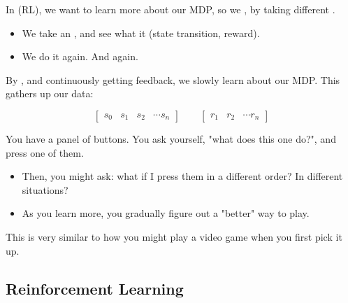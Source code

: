         \begin{concept}
            In  (RL), we want to learn more about our MDP, so we , by taking different .

            \begin{itemize}
                \item We take an , and see what it  (state transition, reward).
                \item We do it again. And again.
                
            \end{itemize}

            By , and continuously getting feedback, we slowly learn about our MDP. This gathers up our data:

            \begin{equation*}
                \begin{bmatrix}
                    s_0 & s_1 & s_2 & \cdots s_{n}
                \end{bmatrix}
                \qquad
                \begin{bmatrix}
                    r_1 & r_2 & \cdots r_n
                \end{bmatrix}
            \end{equation*}
        \end{concept}

        \miniex You have a panel of buttons. You ask yourself, "what does this one do?", and press one of them.

        \begin{itemize}
            \item Then, you might ask: what if I press them in a different order? In different situations?
            \item As you learn more, you gradually figure out a "better" way to play.
        \end{itemize}

        \subsecdiv 

        This is very similar to how you might play a video game when you first pick it up.




        \phantom{}

    \subsection{Reinforcement Learning}

